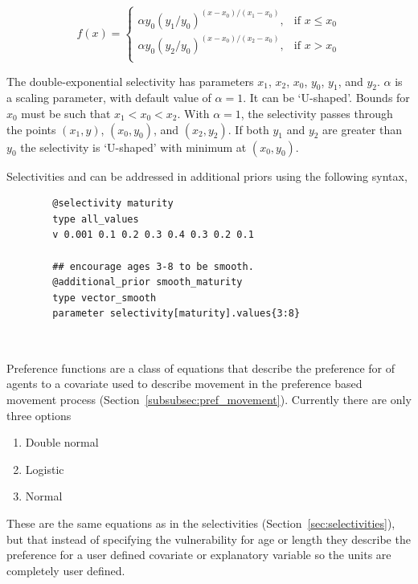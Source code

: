 \begin{equation} 
f(x)=\begin{cases}
	  \alpha y_0(y_1 / y_0)^{(x-x_0)/(x_1-x_0)}, & \text{if $x \le x_0$} \\
	  \alpha y_0(y_2 / y_0)^{(x-x_0)/(x_2-x_0)}, & \text{if $x > x_0$} \\
  \end{cases}
\end{equation}

The double-exponential selectivity has  parameters $x_1$, $x_2$, $x_0$, $y_0$, $y_1$, and $y_2$.  $\alpha$ is a scaling parameter, with default value of $\alpha = 1$. It can be `U-shaped'. Bounds for $x_0$ must be such that $x_1 < x_0 < x_2$. With $\alpha=1$, the selectivity passes through the points $(x_1, y)$, $(x_0, y_0)$, and $(x_2, y_2)$. If both $y_1$ and $y_2$ are greater than $y_0$ the selectivity is `U-shaped' with minimum at $(x_0, y_0)$.


Selectivities  and  can be addressed in additional priors using the following syntax,

{\small{\begin{verbatim}
		@selectivity maturity
		type all_values
		v 0.001 0.1 0.2 0.3 0.4 0.3 0.2 0.1
		
		## encourage ages 3-8 to be smooth.
		@additional_prior smooth_maturity
		type vector_smooth
		parameter selectivity[maturity].values{3:8}
		
		\end{verbatim}}}
	
\subsection{\label{sec:preference_functions}}
Preference functions are a class of equations that describe the preference for of agents to a covariate used to describe movement in the preference based movement process (Section~\ref{subsubsec:pref_movement}). Currently there are only three options

\begin{enumerate}
	\item Double normal
	\item Logistic
	\item Normal
\end{enumerate}

These are the same equations as in the selectivities (Section~\ref{sec:selectivities}), but that instead of specifying the vulnerability for age or length they describe the preference for a user defined covariate or explanatory variable so the units are completely user defined.
